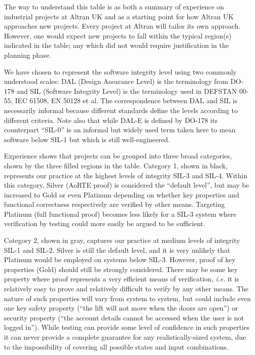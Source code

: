 \documentclass{eceasst}
\newcommand{\ie}{\textit{i.e.}\xspace}
\begin{document}
The way to understand this table is as both a summary of experience on
industrial projects at Altran UK and as a starting point for how Altran UK
approaches new projects. Every project at Altran will tailor its own
approach. However, one would expect new projects to fall within the typical
region(s) indicated in the table; any which did not would require justification
in the planning phase.

We have chosen to represent the software integrity level using two commonly
understood scales: DAL (Design Assurance Level) is the terminology from DO-178
and SIL (Software Integrity Level) is the terminology used in DEFSTAN 00-55,
IEC 61508, EN 50128 et al. The correspondence between DAL and SIL is
necessarily informal because different standards define the levels according to
different criteria. Note also that while DAL-E is defined by DO-178 its
counterpart ``SIL-0'' is an informal but widely used term taken here to mean
software below SIL-1 but which is still well-engineered.

Experience shows that projects can be grouped into three broad categories, shown by the three
filled regions in the table. Category 1, shown in black, represents our
practice at the highest levels of integrity SIL-3 and SIL-4. Within this
category, Silver (AoRTE proof) is considered the ``default level'', but may be
increased to Gold or even Platinum depending on whether key properties and
functional correctness respectively are verified by other means. Targeting
Platinum (full functional proof) becomes less likely for a SIL-3 system where
verification by testing could more easily be argued to be sufficient.

Category 2, shown in gray, captures our practice at medium levels of integrity
SIL-1 and SIL-2. Silver is still the default level, and it is very unlikely
that Platinum would be employed on systems below SIL-3.  However, proof of key
properties (Gold) should still be strongly considered. There may be some key
property where proof represents a very efficient means of verification, \ie it
is relatively easy to prove and relatively difficult to verify by any other
means. The nature of such properties will vary from system to system, but could
include even one key safety property (``the lift will not move when the doors
are open'') or security property (``the account details cannot be accessed when
the user is not logged in''). While testing can provide some level of
confidence in such properties it can never provide a complete guarantee for any
realistically-sized system, due to the impossibility of covering all possible
states and input combinations.
\end{document}
